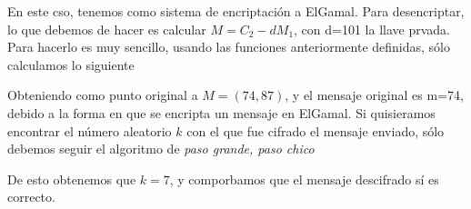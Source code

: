 En este cso, tenemos como sistema de encriptación a ElGamal.
Para desencriptar, lo que debemos de hacer es calcular $M = C_{2} - dM_{1}$, con d=101 la llave prvada.
Para hacerlo es muy sencillo, usando las funciones anteriormente definidas, sólo calculamos lo siguiente 


Obteniendo como punto original a $M = (74,87)$, y el mensaje original es m=74, debido a la forma en que se encripta un mensaje en ElGamal. 
Si quisieramos encontrar el número aleatorio $k$ con el que fue cifrado el mensaje enviado, sólo debemos seguir el algoritmo de \textit{paso grande, paso chico}



De esto obtenemos que $k = 7$, y comporbamos que el mensaje descifrado sí es correcto.